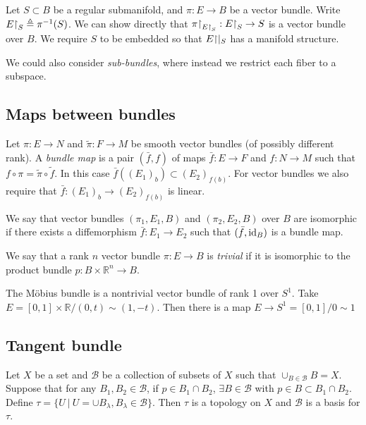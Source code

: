 \begin{xmpl}
Let $S \subset B$ be a regular submanifold, and
$\pi: E \to B$ be a vector bundle. Write
$E\mathord{\upharpoonright}_S \triangleq \pi^{-1}(S)$. We can show directly that
$\pi\mathord{\upharpoonright}_{E\mathord{\upharpoonright}_{S}}: E\mathord{\upharpoonright}_S \to S$ is a vector bundle
over $B$. We require $S$ to be embedded so that $E\mathord{\upharpoonright}|_S$ has a
manifold structure.
\end{xmpl}

We could also consider \emph{sub-bundles}, where instead we restrict
each fiber to a subspace.

\subsection{Maps between bundles}
\begin{defn}
Let $\pi: E \to N$ and $\tilde{\pi}: F \to M$ be smooth vector bundles
(of possibly different rank). A \emph{bundle map} is a pair
$(\bar{f}, f)$ of maps $\bar{f}: E \to F$ and $f: N \to M$ such that
$f \circ \pi = \tilde{\pi} \circ \tilde{f}$. In this case
$\bar{f}((E_1)_b) \subset (E_2)_{f(b)}$. For vector bundles we also
require that $\bar{f}: (E_1)_b \to (E_2)_{f(b)}$ is linear.
\end{defn}

\begin{defn}
We say that vector bundles $(\pi_1, E_1, B)$ and
$(\pi_2, E_2, B)$ over $B$ are isomorphic if there exists a
diffemorphism $\bar{f}: E_1 \to E_2$ such that
$(\bar{f}, \mathrm{id}_B)$ is a bundle map.
\end{defn}

\begin{defn}
We say that a rank $n$ vector bundle $\pi: E \to B$ is \emph{trivial} if it is
isomorphic to the product bundle $p: B \times \mathbb{R}^n \to B$.
\end{defn}

\begin{xmpl}
The M\"obius bundle is a nontrivial vector bundle of rank 1 over
$S^1$. Take $E = [0, 1] \times \mathbb{R} / (0, t) \sim (1, -t)$. Then
there is a map $E \to S^1 = [0, 1] / 0 \sim 1$
\end{xmpl}

\subsection{Tangent bundle}
\begin{prop}
Let $X$ be a set and $\mathscr{B}$ be a collection of
subsets of $X$ such that $\cup_{B \in \mathscr{B}} B = X$.
Suppose that for any $B_1, B_2 \in \mathscr{B}$, if $p \in B_1 \cap
B_2$, $\exists B \in \mathscr{B}$ with $p \in B \subset B_1 \cap B_2$.
Define $\tau = \{U ~\vert~ U = \cup B_\lambda, B_\lambda \in
\mathscr{B}\}$.
Then $\tau$ is a topology on $X$ and $\mathscr{B}$ is a basis for $\tau$.
\end{prop}

